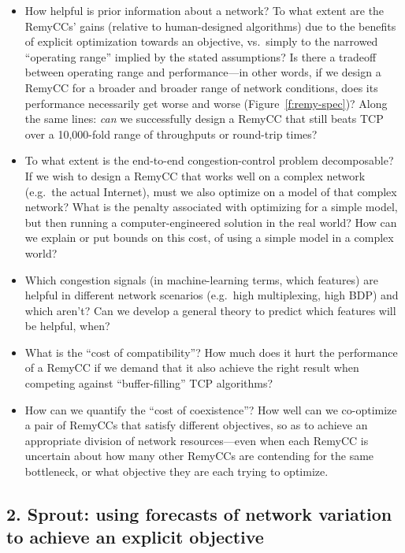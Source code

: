 \documentclass{article}
\begin{document}
\begin{itemize}

\item How helpful is prior information about a network? To what extent
  are the RemyCCs' gains (relative to human-designed algorithms) due
  to the benefits of explicit optimization towards an objective,
  vs.~simply to the narrowed ``operating range'' implied by the stated
  assumptions?  Is there a tradeoff between operating range and
  performance---in other words, if we design a RemyCC for a broader
  and broader range of network conditions, does its performance
  necessarily get worse and worse (Figure~\ref{f:remy-spec})? Along
  the same lines: \emph{can} we successfully design a RemyCC that
  still beats TCP over a 10,000-fold range of throughputs or
  round-trip times?

\item To what extent is the end-to-end congestion-control problem
  decomposable? If we wish to design a RemyCC that works well on a
  complex network (e.g.~the actual Internet), must we also optimize on
  a model of that complex network? What is the penalty associated with
  optimizing for a simple model, but then running a
  computer-engineered solution in the real world? How can we explain
  or put bounds on this cost, of using a simple model in a complex world?

\item Which congestion signals (in machine-learning terms, which
  features) are helpful in different network scenarios (e.g.~high
  multiplexing, high BDP) and which aren't? Can we develop a general theory
  to predict which features will be helpful, when?

\item What is the ``cost of compatibility''? How much does it hurt the performance
of a RemyCC if we demand that it also achieve the right result when competing
against ``buffer-filling'' TCP algorithms?

\item How can we quantify the ``cost of coexistence''? How well can we co-optimize
  a pair of RemyCCs that satisfy different objectives, so as to
  achieve an appropriate division of network resources---even when
  each RemyCC is uncertain about how many other RemyCCs are contending
  for the same bottleneck, or what objective they are each trying to
  optimize.

\end{itemize}

\subsection*{2. Sprout: using forecasts of network variation to achieve an explicit objective}
\end{document}
